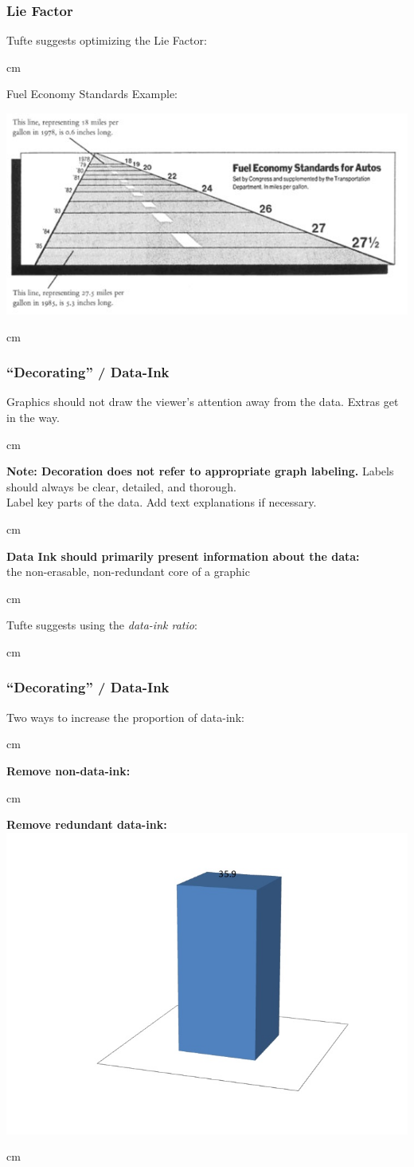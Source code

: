 \documentclass{beamer} %
\begin{document}
\begin{frame}\frametitle{Lie Factor}
	\small
	
	Tufte suggests optimizing the Lie Factor:
	
	 cm
	
	Fuel Economy Standards Example:
	
	\includegraphics[width=0.5\linewidth]{fuel.jpg}
	
	 cm
\end{frame}




\begin{frame}\frametitle{``Decorating'' / Data-Ink}
	\small
	
	Graphics should not draw the viewer's attention away from the data.  Extras get in the way.
	
	 cm
	
	\textbf{Note:  Decoration does not refer to appropriate graph labeling.}  Labels should always be clear, detailed, and thorough.  \\Label key parts of the data.  Add text explanations if necessary.
	
	 cm
	
	\textbf{Data Ink should primarily present information about the data:}  \\the non-erasable, non-redundant core of a graphic
	
	 cm
	
	Tufte suggests using the \emph{data-ink ratio}:
	
	 cm
\end{frame}



\begin{frame}\frametitle{``Decorating'' / Data-Ink}
	\small
	
	Two ways to increase the proportion of data-ink:
	
	 cm
	
	\textbf{Remove non-data-ink:}  
	
	
	 cm
	
	\textbf{Remove redundant data-ink:} \\ 
	\includegraphics[width = 0.6\linewidth]{data-ink.jpg}
	
	 cm
\end{frame}
\end{document}
